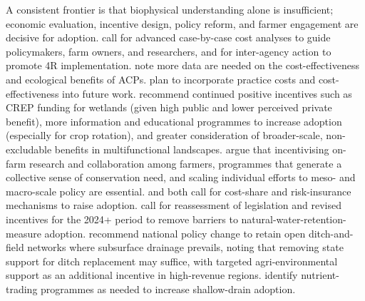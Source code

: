\documentclass[11pt]{article}
\begin{document}
A consistent frontier is that biophysical understanding alone is insufficient; economic evaluation, incentive design, policy reform, and farmer engagement are decisive for adoption. \textcite{Liu2021} call for advanced case-by-case cost analyses to guide policymakers, farm owners, and researchers, and for inter-agency action to promote 4R implementation. \textcite{Yuan2022} note more data are needed on the cost-effectiveness and ecological benefits of ACPs. \textcite{McLellan2015} plan to incorporate practice costs and cost-effectiveness into future work. \textcite{Christianson2014} recommend continued positive incentives such as CREP funding for wetlands (given high public and lower perceived private benefit), more information and educational programmes to increase adoption (especially for crop rotation), and greater consideration of broader-scale, non-excludable benefits in multifunctional landscapes. \textcite{David2015} argue that incentivising on-farm research and collaboration among farmers, programmes that generate a collective sense of conservation need, and scaling individual efforts to meso- and macro-scale policy are essential. \textcite{Jaynes2012} and \textcite{Karlen2005} both call for cost-share and risk-insurance mechanisms to raise adoption. \textcite{Kvítek2023} call for reassessment of legislation and revised incentives for the 2024+ period to remove barriers to natural-water-retention-measure adoption. \textcite{Marja2013} recommend national policy change to retain open ditch-and-field networks where subsurface drainage prevails, noting that removing state support for ditch replacement may suffice, with targeted agri-environmental support as an additional incentive in high-revenue regions. \textcite{Ghane2021b} identify nutrient-trading programmes as needed to increase shallow-drain adoption.
\end{document}

